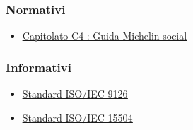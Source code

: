 \subsubsection{Normativi}
\begin{itemize}
\item \color{blue} \underline{\href{https://www.math.unipd.it/~tullio/IS-1/2021/Progetto/C4.pdf}{Capitolato C4 : Guida Michelin social}} \color{black}
\end{itemize}

\subsubsection{Informativi}
\begin{itemize}

\item \color{blue}  \underline{ \href{https://it.wikipedia.org/wiki/ISO/IEC_9126}{Standard ISO/IEC 9126}} \color{black}
\item  \color{blue} \underline{\href{https://en.wikipedia.org/wiki/ISO/IEC_15504}{Standard ISO/IEC 15504}} \color{black}

\end{itemize}
